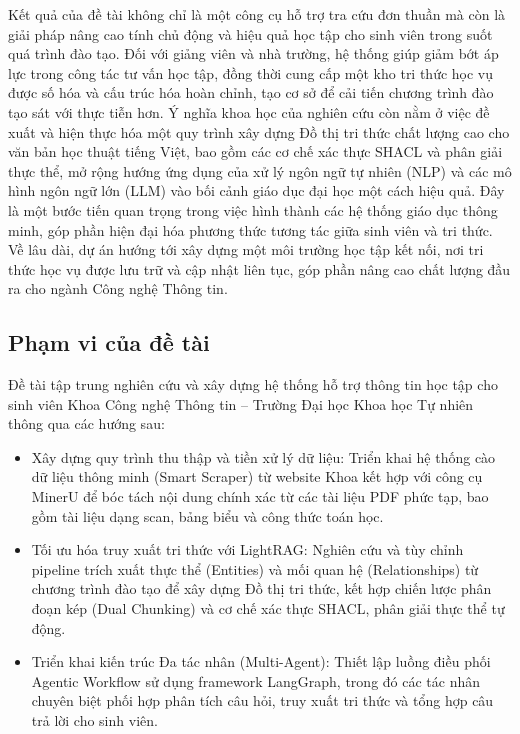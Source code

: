 \documentclass{article}[13pt]
\begin{document}
{     Kết quả của đề tài không chỉ là một công cụ hỗ trợ tra cứu đơn thuần mà còn là giải pháp nâng cao tính chủ động và hiệu quả học tập cho sinh viên trong suốt quá trình đào tạo. Đối với giảng viên và nhà trường, hệ thống giúp giảm bớt áp lực trong công tác tư vấn học tập, đồng thời cung cấp một kho tri thức học vụ được số hóa và cấu trúc hóa hoàn chỉnh, tạo cơ sở để cải tiến chương trình đào tạo sát với thực tiễn hơn. Ý nghĩa khoa học của nghiên cứu còn nằm ở việc đề xuất và hiện thực hóa một quy trình xây dựng Đồ thị tri thức chất lượng cao cho văn bản học thuật tiếng Việt, bao gồm các cơ chế xác thực SHACL và phân giải thực thể, mở rộng hướng ứng dụng của xử lý ngôn ngữ tự nhiên (NLP) và các mô hình ngôn ngữ lớn (LLM) vào bối cảnh giáo dục đại học một cách hiệu quả. Đây là một bước tiến quan trọng trong việc hình thành các hệ thống giáo dục thông minh, góp phần hiện đại hóa phương thức tương tác giữa sinh viên và tri thức. Về lâu dài, dự án hướng tới xây dựng một môi trường học tập kết nối, nơi tri thức học vụ được lưu trữ và cập nhật liên tục, góp phần nâng cao chất lượng đầu ra cho ngành Công nghệ Thông tin.

    \subsection{Phạm vi của đề tài}

    Đề tài tập trung nghiên cứu và xây dựng hệ thống hỗ trợ thông tin học tập cho sinh viên Khoa Công nghệ Thông tin -- Trường Đại học Khoa học Tự nhiên thông qua các hướng sau:

    \begin{itemize}[label={--}, leftmargin=1.5em]
        \item Xây dựng quy trình thu thập và tiền xử lý dữ liệu: Triển khai hệ thống cào dữ liệu thông minh (Smart Scraper) từ website Khoa kết hợp với công cụ MinerU để bóc tách nội dung chính xác từ các tài liệu PDF phức tạp, bao gồm tài liệu dạng scan, bảng biểu và công thức toán học.
        \item Tối ưu hóa truy xuất tri thức với LightRAG: Nghiên cứu và tùy chỉnh pipeline trích xuất thực thể (Entities) và mối quan hệ (Relationships) từ chương trình đào tạo để xây dựng Đồ thị tri thức, kết hợp chiến lược phân đoạn kép (Dual Chunking) và cơ chế xác thực SHACL, phân giải thực thể tự động.
        \item Triển khai kiến trúc Đa tác nhân (Multi-Agent): Thiết lập luồng điều phối Agentic Workflow sử dụng framework LangGraph, trong đó các tác nhân chuyên biệt phối hợp phân tích câu hỏi, truy xuất tri thức và tổng hợp câu trả lời cho sinh viên.
    \end{itemize}

}
\end{document}
